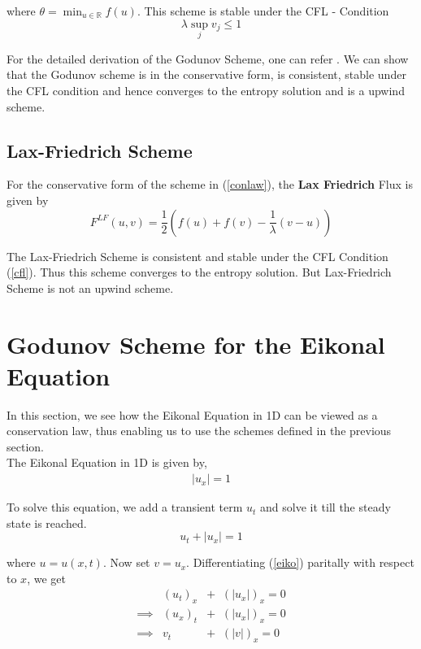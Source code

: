 \noindent
where $\theta = \min_{u \in \mathbb{R}} f(u)$. This scheme is stable under the CFL - Condition\cite{leve}
\begin{equation}
	\lambda \sup_{j} v_j \le 1 \label{cfl}
\end{equation}

\noindent
For the detailed derivation of the Godunov Scheme, one can refer \cite{leve}. We can show that the Godunov scheme is in the conservative form, is consistent, stable under the CFL condition and hence converges to the entropy solution and is a upwind scheme.\cite{leve}

\subsection{Lax-Friedrich Scheme}
For the conservative form of the scheme in (\ref{conlaw}), the \textbf{Lax Friedrich} Flux is given by
\begin{equation}
	F^{LF} (u,v) = \frac{1}{2} \left(f(u) + f(v) - \frac{1}{\lambda} (v - u)\right) \label{laxf}
\end{equation}

\noindent 
The Lax-Friedrich Scheme is consistent and stable under the CFL Condition (\ref{cfl}). Thus this scheme converges to the entropy solution. But Lax-Friedrich Scheme is not an upwind scheme.

\section{Godunov Scheme for the Eikonal Equation}
In this section, we see how the Eikonal Equation in 1D can be viewed as a conservation law, thus enabling us to use the schemes defined in the previous section.\\

\noindent
The Eikonal Equation in 1D is given by, 
\begin{eqnarray}
	\lvert u_x \rvert = 1
\end{eqnarray}

\noindent
To solve this equation, we add a transient term $u_t$ and solve it till the steady state is reached.
\begin{equation}
	u_t + \lvert u_x \rvert = 1 \label{eiko}
\end{equation}

\noindent
where $u = u(x,t)$. Now set $v = u_x$. Differentiating (\ref{eiko}) paritally with respect to $x$, we get
\begin{eqnarray}
	&(u_t)_x& + \;\;(\lvert u_x \rvert)_x = 0\nonumber\\
	\implies &(u_x)_t& + \;\;(\vert u_x \rvert)_x = 0\nonumber\\
	\implies & v_t& + \;\;(\lvert v \rvert)_x = 0 \label{conlaw2}
\end{eqnarray}


